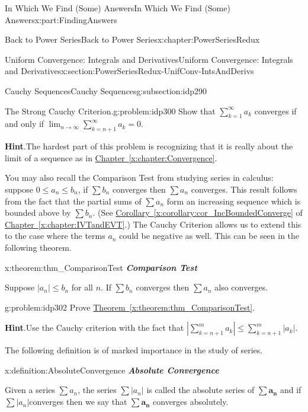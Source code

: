 \documentclass[oneside,10pt,]{book}
\newcommand{\blocktitlefont}{\relax}
\newcommand{\xreffont}{\relax}
\newcommand{\alert}[1]{\textbf{\textit{#1}}}
\numberwithin{equation}{section}
\newcommand{\abs}[1]{\left|#1\right|}
\def\limit#1#2#3{{\displaystyle\lim_{#1\rightarrow #2}#3}}
\begin{document}
\begin{partptx}{In Which We Find (Some) Answers}{}{In Which We Find (Some) Answers}{}{}{x:part:FindingAnswers}
\begin{chapterptx}{Back to Power Series}{}{Back to Power Series}{}{}{x:chapter:PowerSeriesRedux}
\begin{sectionptx}{Uniform Convergence: Integrals and Derivatives}{}{Uniform Convergence: Integrals and Derivatives}{}{}{x:section:PowerSeriesRedux-UnifConv-IntsAndDerivs}
\begin{subsectionptx}{Cauchy Sequences}{}{Cauchy Sequences}{}{}{g:subsection:idp290}
\begin{problem}{The Strong Cauchy Criterion.}{g:problem:idp300}
 Show that \(\displaystyle\sum_{k=1}^\infty a_k\) converges if and only if \(\limit{n}{\infty}{\sum_{k=n+1}^\infty a_k}=0\).%
\par\smallskip%
\noindent\textbf{\blocktitlefont Hint}.\hypertarget{g:hint:idp301}{}\quad{}The hardest part of this problem is recognizing that it is really about the limit of a sequence as in \hyperref[x:chapter:Convergence]{Chapter~{\xreffont\ref{x:chapter:Convergence}}}.%
\end{problem}
You may also recall the Comparison Test from studying series in calculus: suppose \(0\leq a_n\leq b_n\), if \(\sum b_n\) converges then \(\sum a_n\) converges. This result follows from the fact that the partial sums of \(\sum a_n\) form an increasing sequence which is bounded above by \(\sum b_n\). (See \hyperref[x:corollary:cor_IncBoundedConverge]{Corollary~{\xreffont\ref{x:corollary:cor_IncBoundedConverge}}} of \hyperref[x:chapter:IVTandEVT]{Chapter~{\xreffont\ref{x:chapter:IVTandEVT}}}.) The Cauchy Criterion allows us to extend this to the case where the terms \(a_n\) could be negative as well. This can be seen in the following theorem.%
\begin{theorem}{}{}{x:theorem:thm_ComparisonTest}%
\alert{Comparison Test}%
\par
{} Suppose \(|a_n|\leq b_n\) for all \(n\). If \(\sum b_n\) converges then \(\sum a_n\) also converges.%
\end{theorem}
\begin{problem}{}{g:problem:idp302}%
Prove \hyperref[x:theorem:thm_ComparisonTest]{Theorem~{\xreffont\ref{x:theorem:thm_ComparisonTest}}}.%
\par\smallskip%
\noindent\textbf{\blocktitlefont Hint}.\hypertarget{g:hint:idp303}{}\quad{}Use the Cauchy criterion with the fact that \(\abs{\sum_{k=n+1}^ma_k}\leq\sum_{k=n+1}^m\abs{a_k}\).%
\end{problem}
The following definition is of marked importance in the study of series.%
\begin{definition}{}{x:definition:AbsoluteConvergence}%
\alert{Absolute Convergence}%
\par
{} Given a series \(\sum a_n\), the series \(\sum|a_n|\) is called the \textbraceleft{}absolute series\textbraceright{} of \(\sum\boldsymbol{a}_{\boldsymbol{n}}\) and if \(\sum|a_n|\)converges then we say that \(\sum\boldsymbol{a}_{\boldsymbol{n}}\) converges absolutely.%
\end{definition}

\end{subsectionptx}
\end{sectionptx}
\end{chapterptx}
\end{partptx}
\end{document}
